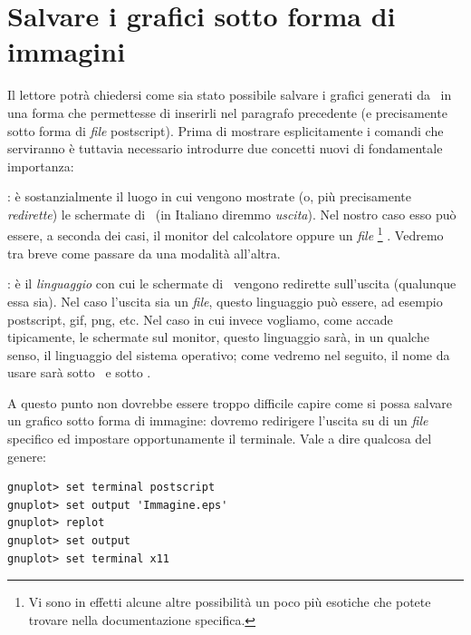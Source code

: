 \section{Salvare i grafici sotto forma di immagini}

Il lettore potr\`a chiedersi come sia stato possibile salvare i grafici
generati da \gnuplot\ in una forma che permettesse di inserirli nel paragrafo
precedente (e precisamente sotto forma di \emph{file} postscript).
Prima di mostrare esplicitamente i comandi che serviranno \`e tuttavia
necessario introdurre due concetti nuovi di fondamentale importanza:
\begin{numlist}
\item{
:
\`e sostanzialmente il luogo in cui vengono mostrate (o, pi\`u precisamente
\emph{redirette}) le schermate di \gnuplot\ (in Italiano diremmo
\emph{uscita}). Nel nostro caso esso pu\`o essere, a seconda dei casi, il
monitor del calcolatore oppure un \emph{file}%
\footnote{
Vi sono in effetti alcune altre possibilit\`a un poco pi\`u esotiche che
potete trovare nella documentazione specifica.
}%
.
Vedremo tra breve come passare da una modalit\`a all'altra.
}
\item{
:
\`e il \emph{linguaggio} con cui le schermate di \gnuplot\ vengono redirette
sull'uscita (qualunque essa sia). Nel caso l'uscita sia un \emph{file}, questo
linguaggio pu\`o essere, ad esempio postscript, gif, png, etc.
Nel caso in cui invece vogliamo, come accade tipicamente, le schermate
sul monitor, questo linguaggio sar\`a, in un qualche senso, il
linguaggio del sistema operativo; come vedremo nel seguito, il nome da usare
sar\`a  sotto \linux\ e  sotto \windows.
}
\end{numlist}

A questo punto non dovrebbe essere troppo difficile capire come si possa
salvare un grafico sotto forma di immagine: dovremo redirigere l'uscita su di
un \emph{file} specifico ed impostare opportunamente il terminale.
Vale a dire qualcosa del genere:
\begin{verbatim}
gnuplot> set terminal postscript
gnuplot> set output 'Immagine.eps'
gnuplot> replot
gnuplot> set output
gnuplot> set terminal x11
\end{verbatim}


